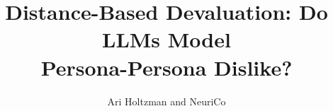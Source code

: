 \documentclass{article}
\title{Distance-Based Devaluation: Do LLMs Model \\ Persona-Persona Dislike?}
\author{Ari Holtzman and NeuriCo}
\begin{document}
\maketitle

\begin{abstract}

\end{abstract}








\appendix


\newpage

\end{document}

